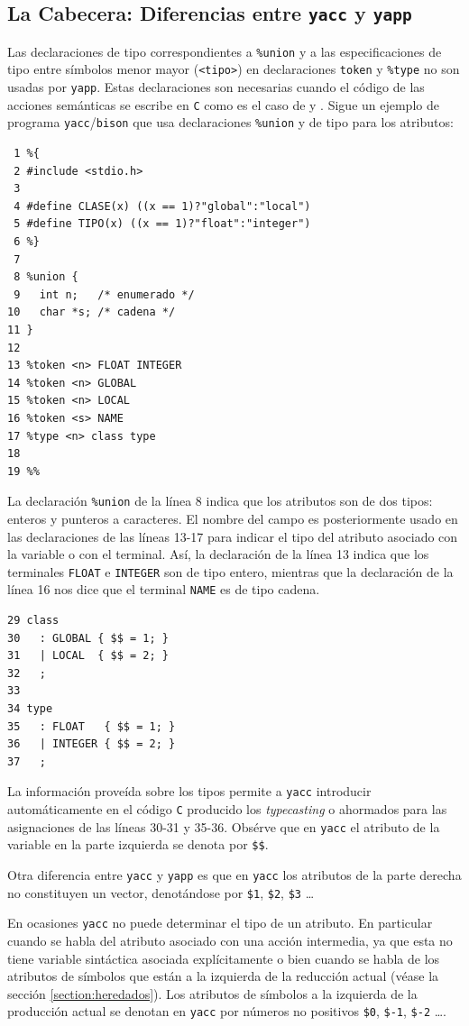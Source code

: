 \subsection{La Cabecera: Diferencias entre {\tt yacc} y {\tt yapp}}
\label{subsection:cabecerayaccyapp}
Las declaraciones de tipo
correspondientes a \verb|%union| y a las especificaciones de 
tipo entre símbolos menor mayor (\verb|<tipo>|) en declaraciones \verb|token| y 
\verb|%type| no son usadas por \verb|yapp|. Estas declaraciones son
necesarias cuando el código de las acciones semánticas
se escribe en \verb|C| como es el caso de  y .
Sigue un ejemplo de programa \verb|yacc|/\verb|bison| que usa declaraciones \verb|%union|
y de tipo para los atributos:

\begin{verbatim}
 1 %{
 2 #include <stdio.h>
 3 
 4 #define CLASE(x) ((x == 1)?"global":"local")
 5 #define TIPO(x) ((x == 1)?"float":"integer")
 6 %}
 7 
 8 %union {
 9   int n;   /* enumerado */
10   char *s; /* cadena */
11 }
12 
13 %token <n> FLOAT INTEGER 
14 %token <n> GLOBAL 
15 %token <n> LOCAL 
16 %token <s> NAME
17 %type <n> class type
18 
19 %%
\end{verbatim}
La declaración \verb|%union| de la línea 8 indica que los atributos
son de dos tipos: enteros y punteros a caracteres. 
El nombre del campo es posteriormente usado en las 
declaraciones de las líneas 13-17 para indicar el tipo 
del atributo asociado con la variable o con el terminal.
Así, la declaración de la línea 13 indica 
que los terminales \verb|FLOAT| e \verb|INTEGER|
son de tipo entero, mientras que la declaración de la línea 16 nos
dice que el terminal \verb|NAME| es de tipo cadena.
\begin{verbatim}
29 class
30   : GLOBAL { $$ = 1; }
31   | LOCAL  { $$ = 2; }
32   ;
33 
34 type
35   : FLOAT   { $$ = 1; }
36   | INTEGER { $$ = 2; }
37   ;
\end{verbatim}
La información proveída sobre los tipos permite a \verb|yacc| 
introducir automáticamente en el código \verb|C| producido 
los \emph{typecasting} o ahormados
para las asignaciones de las líneas 30-31 y 35-36. Obsérve que
en \verb|yacc| el atributo de la variable en la parte izquierda
se denota por \verb|$$|.

Otra diferencia entre \verb|yacc| y \verb|yapp| es que en \verb|yacc| los 
atributos de la parte derecha no constituyen un vector, denotándose
por \verb|$1|, \verb|$2|, \verb|$3| \ldots 

En ocasiones \verb|yacc| no puede determinar el tipo de un atributo. 
En particular cuando se habla del atributo asociado con una acción
intermedia, ya que esta no tiene variable sintáctica asociada 
explícitamente o bien cuando se habla de los atributos
de símbolos que están a la izquierda de la reducción actual
(véase la sección \ref{section:heredados}). Los atributos de símbolos 
a la izquierda de la producción actual se denotan en \verb|yacc| por números 
no positivos \verb|$0|, \verb|$-1|, \verb|$-2| \ldots. 

